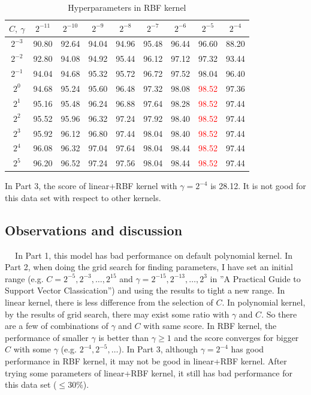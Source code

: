 \documentclass{article}
\begin{document}
\begin{table}[h!]
\begin{center}
\begin{tabular}{ |c|c|c|c|c|c|c|c|c| } 
 \hline
$C,\ \gamma$  & $2^{-11}$ &$2^{-10}$ &$2^{-9}$ &$2^{-8}$ &$2^{-7}$ &$2^{-6}$ & $2^{-5}$ & $2^{-4}$ \\ \hline
$2^{-3}$ & 90.80 & 92.64 & 94.04 & 94.96 & 95.48 & 96.44 & 96.60 & 88.20 \\ \hline
$2^{-2}$ & 92.80 & 94.08 & 94.92 & 95.44 & 96.12 & 97.12 & 97.32 & 93.44 \\ \hline 
$2^{-1}$ & 94.04 & 94.68 & 95.32 & 95.72 & 96.72 & 97.52 & 98.04 & 96.40 \\ \hline 
$2^0$ & 94.68 & 95.24 & 95.60 & 96.48 & 97.32 & 98.08 & \textcolor{red}{98.52} & 97.36 \\ \hline 
$2^1$ & 95.16 & 95.48 & 96.24 & 96.88 & 97.64 & 98.28 & \textcolor{red}{98.52} & 97.44 \\ \hline 
$2^{2}$ & 95.52 & 95.96 & 96.32 & 97.24 & 97.92 & 98.40 & \textcolor{red}{98.52} & 97.44 \\ \hline 
$2^{3}$ & 95.92 & 96.12 & 96.80 & 97.44 & 98.04 & 98.40 & \textcolor{red}{98.52} & 97.44\\ \hline 
$2^{4}$ & 96.08 & 96.32 & 97.04 & 97.64 & 98.04 & 98.44 & \textcolor{red}{98.52} & 97.44\\ \hline 
$2^{5}$ & 96.20 & 96.52 & 97.24 & 97.56 & 98.04 & 98.44 & \textcolor{red}{98.52} & 97.44 \\ \hline 
\end{tabular}
\end{center}
\caption{Hyperparameters in RBF kernel}
\label{table}
\end{table}

In Part 3, the score of linear+RBF kernel with $\gamma=2^{-4}$ is 28.12. It is not good for this data set with respect to other kernels.

\subsection{Observations and discussion}
$\quad\ $In Part 1, this model has bad performance on default polynomial kernel. In Part 2, when doing the grid search for finding parameters, I have set an initial range (e.g. $C=2^{-5},2^{-3},\dots,2^{15}$ and $\gamma=2^{-15},2^{-13},\dots,2^{3}$ in ''A Practical Guide to Support Vector Classication'') and using the results to tight a new range. In linear kernel, there is less difference from the selection of $C$. In polynomial kernel, by the results of grid search, there may exist some ratio with $\gamma$ and $C$. So there are a few of combinations of $\gamma$ and $C$ with same score. In RBF kernel, the performance of smaller $\gamma$ is better than $\gamma \geq 1$ and the score converges for bigger $C$ with some $\gamma$ (e.g. $2^{-4},2^{-5},\dots$). In Part 3, although $\gamma=2^{-4}$ has good performance in RBF kernel, it may not be good in linear+RBF kernel. After trying some parameters of  linear+RBF kernel, it still has bad performance for this data set ($\leq 30\%$).

\end{document}
